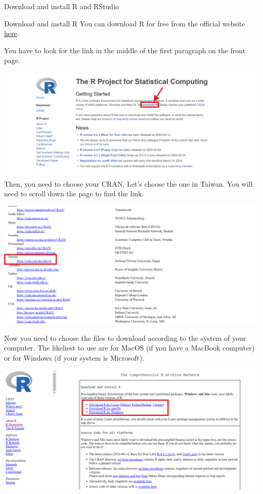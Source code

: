 \documentclass[
  ignorenonframetext,
]{beamer}
\begin{document}
\begin{frame}{Download and install R and RStudio}
\protect\hypertarget{download-and-install-r-and-rstudio}{}
\begin{block}{Download and install R}
\protect\hypertarget{download-and-install-r}{}
You can download R for free from the official website
\href{https://www.r-project.org/}{here}.

You have to look for the link in the middle of the first paragraph on
the front page.

\includegraphics{./assets/images/RWebsite_FrontPage.png}

Then, you need to choose your CRAN. Let's choose the one in Taiwan. You
will need to scroll down the page to find the link.

\includegraphics{./assets/images/RWebsite_CRAN.png}

Now you need to choose the files to download according to the system of
your computer. The likeliest to use are for MacOS (if you have a MacBook
computer) or for Windows (if your system is Microsoft).

\includegraphics{./assets/images/RWebsite_Download.png}


\end{block}
\end{frame}
\end{document}
